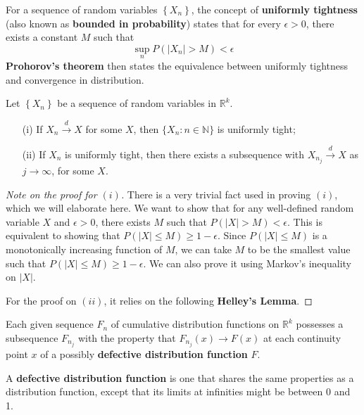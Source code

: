\documentclass{article}
\begin{document}
% 
% 

For a sequence of random variables $\left\{ X_n \right\}$, the concept of \textbf{uniformly tightness} (also known as \textbf{bounded in probability}) states that for every $\epsilon > 0$, there exists a constant $M$ such that 
\begin{equation}
    \sup_{n} P(|X_n| > M) < \epsilon
\end{equation}
\textbf{Prohorov's theorem} then states the equivalence between uniformly tightness and convergence in distribution.
\begin{theorem}
    Let $\left\{ X_n \right\}$ be a sequence of random variables in $\mathbb{R}^k$.
    \begin{itemize}
        \item[(i)] If $X_n \xrightarrow{d} X$ for some $X$, then $\{X_n : n \in \mathbb{N}\}$ is uniformly tight;
        \item[(ii)] If $X_n$ is uniformly tight, then there exists a subsequence with $X_{n_j} \xrightarrow{d} X$ as $j \to \infty$, for some $X$.
    \end{itemize}
\end{theorem}
\begin{proof}[Note on the proof for $(i)$]
    There is a very trivial fact used in proving $(i)$, which we will elaborate here. We want to show that for any well-defined random variable $X$ and $\epsilon > 0$, there exists $M$ such that $P(|X| > M) < \epsilon$. This is equivalent to showing that $P(|X| \leq M) \geq 1 - \epsilon$. Since $P(|X| \leq M)$ is a monotonically increasing function of $M$, we can take $M$ to be the smallest value such that $P(|X| \leq M) \geq 1 - \epsilon$. We can also prove it using Markov's inequality on $|X|$.

    For the proof on $(ii)$, it relies on the following \textbf{Helley's Lemma}.
\end{proof}
\begin{lemma}
    Each given sequence $F_n$ of cumulative distribution functions on $\mathbb{R}^k$ possesses a subsequence $F_{n_j}$ with the property that $F_{n_j}(x) \to F(x)$ at each continuity point $x$ of a possibly \textbf{defective distribution function} $F$.
    \vspace*{0.2em}

    A \textbf{defective distribution function} is one that shares the same properties as a distribution function, except that its limits at infinities might be between 0 and 1.
\end{lemma}
\end{document}
